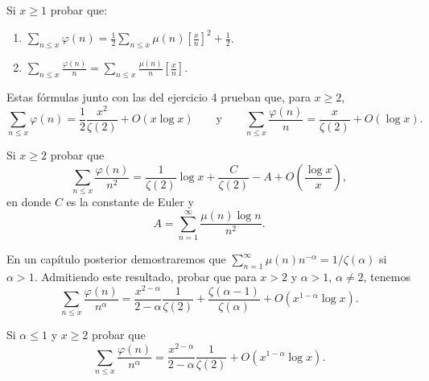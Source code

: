 \documentclass[12pt,a4paper]{book}
\begin{document}
    \begin{ejercicio}
        Si $x\geq1$ probar que:
        \begin{enumerate}
            \item[(a)] $\displaystyle\sum_{n\leq x}\varphi(n)
            =\frac{1}{2}\sum_{n\leq x}\mu(n)\left[\frac{x}{n}\right]^{2}+\frac{1}{2}$.
            \item[(b)] $\displaystyle\sum_{n\leq x}\frac{\varphi(n)}{n}
            =\sum_{n\leq x}\frac{\mu(n)}{n}\left[\frac{x}{n}\right]$.
        \end{enumerate}
        Estas fórmulas junto con las del ejercicio 4 prueban que, para $x\geq2$,
        \begin{equation*}
            \sum_{n\leq x}\varphi(n)=\frac{1}{2}\frac{x^{2}}{\zeta(2)}+O(x\log x)
            \qquad\text{y}\qquad
            \sum_{n\leq x}\frac{\varphi(n)}{n}=\frac{x}{\zeta(2)}+O(\log x).
        \end{equation*}
    \end{ejercicio}

    \begin{ejercicio}
        Si $x\geq2$ probar que
        \begin{equation*}
            \sum_{n\leq x}\frac{\varphi(n)}{n^{2}}=\frac{1}{\zeta(2)}\log x+\frac{C}{\zeta(2)}-A
            +O\left(\frac{\log x}{x}\right),
        \end{equation*}
        en donde $C$ es la constante de Euler y
        \begin{equation*}
            A=\sum_{n=1}^{\infty}\frac{\mu(n)\log n}{n^{2}}.
        \end{equation*}
    \end{ejercicio}

    \begin{ejercicio}
        En un capítulo posterior demostraremos que $\sum_{n=1}^{\infty}\mu(n)n^{-\alpha}
        =1/\zeta(\alpha)$ si $\alpha>1$. Admitiendo este resultado, probar que para $x>2$
        y $\alpha>1$, $\alpha\neq2$, tenemos
        \begin{equation*}
            \sum_{n\leq x}\frac{\varphi(n)}{n^{\alpha}}=\frac{x^{2-\alpha}}{2-\alpha}
            \frac{1}{\zeta(2)}+\frac{\zeta(\alpha-1)}{\zeta(\alpha)}+O(x^{1-\alpha}\log x).
        \end{equation*}
    \end{ejercicio}

    \begin{ejercicio}
        Si $\alpha\leq1$ y $x\geq2$ probar que
        \begin{equation*}
            \sum_{n\leq x}\frac{\varphi(n)}{n^{\alpha}}=\frac{x^{2-\alpha}}{2-\alpha}\frac{1}{\zeta(2)}
            +O(x^{1-\alpha}\log x).
        \end{equation*}
    \end{ejercicio}
\end{document}
